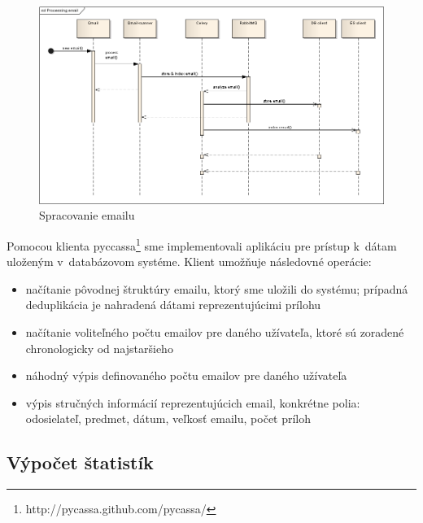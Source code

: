 \documentclass[11pt,twoside,a4paper]{book}
\begin{document}
\begin{figure}[h]
 \centering
 \includegraphics[width=16cm]{./figures/emailProcessing.png}
 \caption{Spracovanie emailu}
 \label{fig:Cseq}
\end{figure}

Pomocou klienta pyccassa\footnote{http://pycassa.github.com/pycassa/} sme implementovali aplikáciu pre prístup k~dátam uloženým v~databázovom systéme. Klient umožňuje následovné operácie:
\begin{itemize}
 \item načítanie pôvodnej štruktúry emailu, ktorý sme uložili do systému; prípadná deduplikácia je nahradená dátami reprezentujúcimi prílohu
 \item načítanie voliteľného počtu emailov pre daného užívateľa, ktoré sú zoradené chronologicky od najstaršieho
 \item náhodný výpis definovaného počtu emailov pre daného užívateľa
 \item výpis stručných informácií reprezentujúcich email, konkrétne polia: odosielateľ, predmet, dátum, veľkosť emailu, počet príloh
\end{itemize}



\subsection{Výpočet štatistík}
\end{document}
